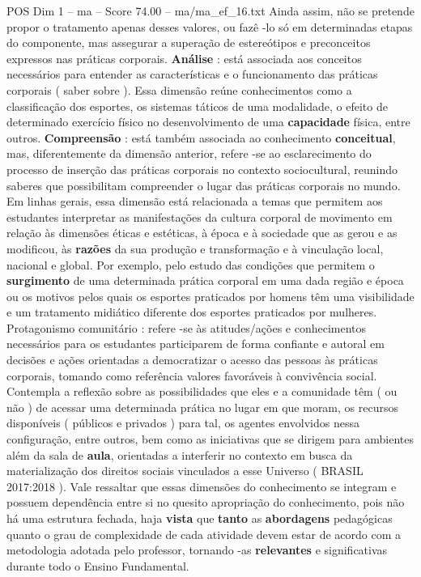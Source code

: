 \begin{textsample}{POS Dim 1 – ma – Score 74.00 – ma/ma\_ef\_16.txt}
Ainda assim, não se pretende propor o tratamento apenas desses valores, ou fazê -lo só em determinadas etapas do componente, mas assegurar a superação de estereótipos e preconceitos expressos nas práticas corporais. \textbf{Análise} : está associada aos conceitos necessários para entender as características e o funcionamento das práticas corporais ( saber sobre ).
Essa dimensão reúne conhecimentos como a classificação dos esportes, os sistemas táticos de uma modalidade, o efeito de determinado exercício físico no desenvolvimento de uma \textbf{capacidade} física, entre outros. \textbf{Compreensão} : está também associada ao conhecimento \textbf{conceitual}, mas, diferentemente da dimensão anterior, refere -se ao esclarecimento do processo de inserção das práticas corporais no contexto sociocultural, reunindo saberes que possibilitam compreender o lugar das práticas corporais no mundo.
Em linhas gerais, essa dimensão está relacionada a temas que permitem aos estudantes interpretar as manifestações da cultura corporal de movimento em relação às dimensões éticas e estéticas, à época e à sociedade que as gerou e as modificou, às \textbf{razões} da sua produção e transformação e à vinculação local, nacional e global.
Por exemplo, pelo estudo das condições que permitem o \textbf{surgimento} de uma determinada prática corporal em uma dada região e época ou os motivos pelos quais os esportes praticados por homens têm uma visibilidade e um tratamento midiático diferente dos esportes praticados por mulheres.
Protagonismo comunitário : refere -se às atitudes/ações e conhecimentos necessários para os estudantes participarem de forma confiante e autoral em decisões e ações orientadas a democratizar o acesso das pessoas às práticas corporais, tomando como referência valores favoráveis à convivência social.
Contempla a reflexão sobre as possibilidades que eles e a comunidade têm ( ou não ) de acessar uma determinada prática no lugar em que moram, os recursos disponíveis ( públicos e privados ) para tal, os agentes envolvidos nessa configuração, entre outros, bem como as iniciativas que se dirigem para ambientes além da sala de \textbf{aula}, orientadas a interferir no contexto em busca da materialização dos direitos sociais vinculados a esse Universo ( BRASIL 2017:2018 ).
Vale ressaltar que essas dimensões do conhecimento se integram e possuem dependência entre si no quesito apropriação do conhecimento, pois não há uma estrutura fechada, haja \textbf{vista} que \textbf{tanto} as \textbf{abordagens} pedagógicas quanto o grau de complexidade de cada atividade devem estar de acordo com a metodologia adotada pelo professor, tornando -as \textbf{relevantes} e significativas durante todo o Ensino Fundamental.

\end{textsample}
